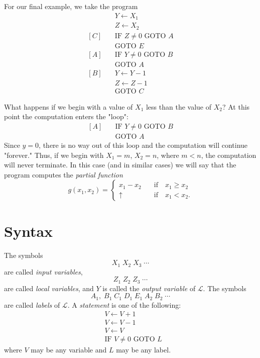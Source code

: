 \documentclass[a4paper,10pt,twoside]{book}
\begin{document}
For our final example, we take the program
\begin{equation*}
    \begin{aligned}&Y\leftarrow X_{1}\\ &Z\leftarrow X_{2}\\ [C]\quad&\text{IF }Z\neq0\text{ GOTO }A\\ &\text{GOTO }E\\ [A]\quad&\text{IF }Y\neq0\text{ GOTO }B\\ &\text{GOTO }A\\ [B]\quad&Y\leftarrow Y-1\\ &Z\leftarrow Z-1\\ &\text{GOTO }C\end{aligned}
\end{equation*}

What happens if we begin with a value of $X_1$ less than the value of $X_2$? At this point the computation enters the "loop":
\begin{equation*}
    \begin{aligned}[A]\quad&\text{IF }Y\neq 0\text{ GOTO }B\\&\text{GOTO }A\end{aligned}
\end{equation*}
Since $y=0$, there is no way out of this loop and the computation will continue "forever." Thus, if we begin with $X_1=m$, $X_2=n$, where $m<n$, the computation will never terminate. In this case (and in similar cases) we will say that the program computes the \textit{partial function} $$g(x_1,x_2)=\begin{cases}x_1-x_2&\quad\text{if}\quad x_1\geq x_2\\\uparrow&\quad\text{if}\quad x_1<x_2.\end{cases}$$

\section{Syntax}

The symbols $$X_1\;X_2\;X_3\;\cdots$$ are called \textit{input variables}, $$Z_1\;Z_2\;Z_3\;\cdots$$ are called \textit{local variables}, and $Y$ is called the \textit{output variable} of $\mathscr{L}$. The symbols $$A_1,\;B_1\;C_1\;D_1\;E_1\;A_2\;B_2\;\cdots$$ are called \textit{labels} of $\mathscr{L}$. A \textit{statement} is one of the following:
\begin{equation*}
    \begin{aligned}&V\leftarrow V+1\\&V\leftarrow V-1\\&V\leftarrow V\\&\text{IF }V\neq 0\text{ GOTO }L\end{aligned}
\end{equation*}
where $V$ may be any variable and $L$ may be any label.
\end{document}
